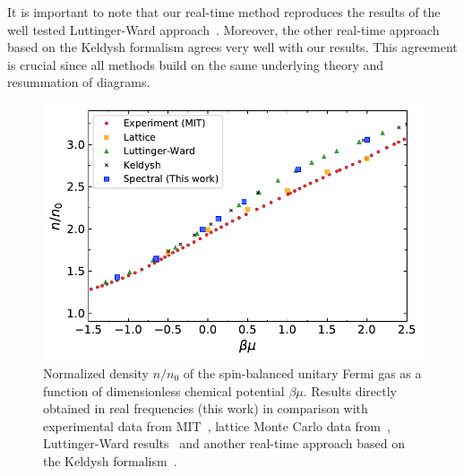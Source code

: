 It is important to note that our real-time method reproduces the results of the well tested Luttinger-Ward approach~\cite{Haussmann2007,Frank2018}. Moreover, the other real-time approach based on the Keldysh formalism agrees very well with our results. This agreement is crucial since all methods build on the same underlying theory and resummation of diagrams.


\begin{figure}[t]
	\centering
	\includegraphics[width=0.67\linewidth]{figs/density_eos.pdf}
	\caption[Density equation of state of the unitary Fermi gas]{Normalized density $n/n_0$ of the spin-balanced unitary Fermi gas as a function of dimensionless chemical potential $\beta\mu$. Results directly obtained in real frequencies (this work) in comparison with experimental data from MIT~\cite{Ku2012}, lattice Monte Carlo data from~\cite{Bauer2023}, Luttinger-Ward results~\cite{Haussmann2007} and another real-time approach based on the Keldysh formalism~\cite{Lang2023}.}
	\label{fig:density_eos}
\end{figure}
